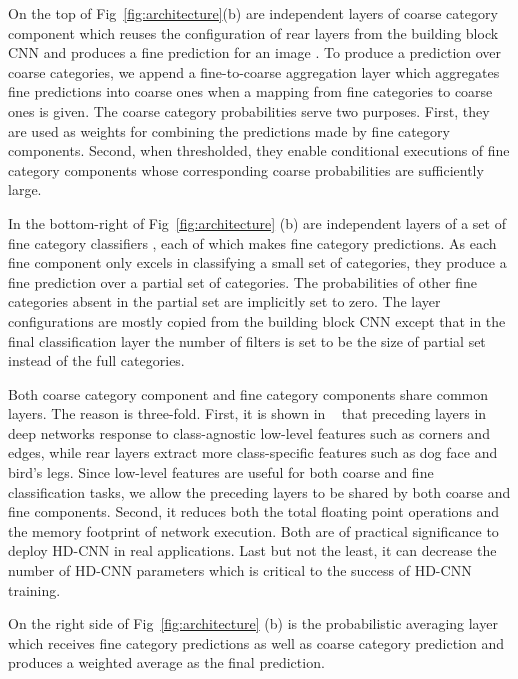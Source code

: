 \documentclass[10pt,twocolumn,letterpaper]{article}
\begin{document}
On the top of Fig~\ref{fig:architecture}(b) are independent layers of coarse category component  which reuses the configuration of rear layers from the building block CNN and produces a fine prediction  for an image . To produce a prediction  over coarse categories, we append a fine-to-coarse aggregation layer which aggregates fine predictions into coarse ones when a mapping from fine categories to coarse ones  is given. The coarse category probabilities serve two purposes. First, they are used as weights for combining the predictions made by fine category components. Second, when thresholded, they enable conditional executions of fine category components whose corresponding coarse probabilities are sufficiently large.

In the bottom-right of Fig~\ref{fig:architecture} (b) are independent layers of a set of fine category classifiers  , each of which makes fine category predictions. As each fine component only excels in classifying a small set of categories, they produce a fine prediction over a partial set of categories. The probabilities of other fine categories absent in the partial set are implicitly set to zero. The layer configurations are mostly copied from the building block CNN except that in the final classification layer the number of filters is set to be the size of partial set instead of the full categories.

Both coarse category component and fine category components share common layers. The reason is three-fold. First, it is shown in ~\cite{zeiler2014visualizing} that preceding layers in deep networks response to class-agnostic low-level features such as corners and edges, while rear layers extract more class-specific features such as dog face and bird's legs. Since low-level features are useful for both coarse and fine classification tasks, we allow the preceding layers to be shared by both coarse and fine components. Second, it reduces both the total floating point operations and the memory footprint of network execution. Both are of practical significance to deploy HD-CNN in real applications. Last but not the least, it can decrease the number of HD-CNN parameters which is critical to the success of HD-CNN training.



On the right side of Fig~\ref{fig:architecture} (b) is the probabilistic averaging layer which receives fine category predictions as well as coarse category prediction and produces a weighted average as the final prediction.
\end{document}
